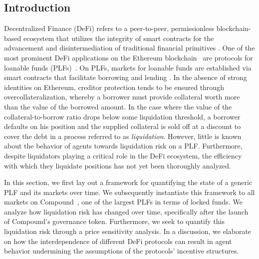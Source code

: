 \subsection{Introduction}
\label{sec:introduction}

Decentralized Finance (DeFi) refers to a peer-to-peer, permissionless blockchain-based ecosystem that utilizes the integrity of smart contracts for the advancement and disintermediation of traditional financial primitives \cite{Werner2021}. 
One of the most prominent DeFi applications on the Ethereum blockchain~\cite{wood2014ethereum} are protocols for loanable funds (PLFs)~\cite{gudgeon2020defi}.
On PLFs, markets for loanable funds are established via smart contracts that facilitate borrowing and lending \cite{Xu2021FromMarket}.
In the absence of strong identities on Ethereum, creditor protection tends to be ensured through overcollateralization, whereby a borrower must provide collateral worth more than the value of the borrowed amount.
In the case where the value of the collateral-to-borrow ratio drops below some liquidation threshold, a borrower defaults on his position and the supplied collateral is sold off at a discount to cover the debt in a process referred to as \textit{liquidation}.
However, little is known about the behavior of agents towards liquidation risk on a PLF.
Furthermore, despite liquidators playing a critical role in the DeFi ecosystem, the efficiency with which they liquidate positions has not yet been thoroughly analyzed.

In this section, we first lay out a framework for quantifying the state of a generic PLF and its markets over time. 
We subsequently instantiate this framework to all markets on Compound~\cite{Leshner2018}, one of the largest PLFs in terms of locked funds.
We analyze how liquidation risk has changed over time, specifically after the launch of Compound's governance token.
Furthermore, we seek to quantify this liquidation risk through a price sensitivity analysis.
In a discussion, we elaborate on how the interdependence of different DeFi protocols can result in agent behavior undermining the assumptions of the protocols' incentive structures.

